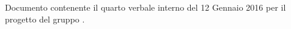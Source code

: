 Documento contenente il quarto verbale interno del 12 Gennaio 2016 per il progetto \progetto{} del gruppo \gruppo{}.